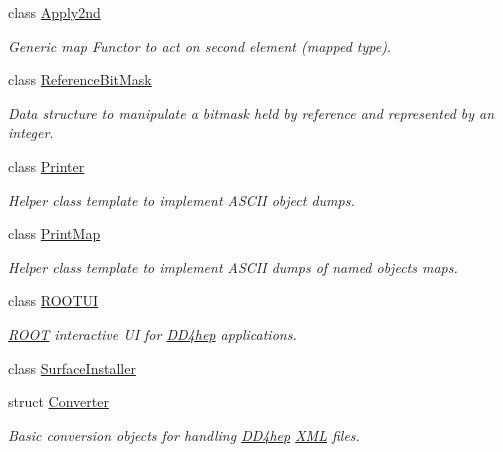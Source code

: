 \begin{DoxyCompactItemize}
class \hyperlink{class_d_d4hep_1_1_apply2nd}{Apply2nd}
\begin{DoxyCompactList}\small\item\em Generic map Functor to act on second element (mapped type). \item\end{DoxyCompactList}\item 
class \hyperlink{class_d_d4hep_1_1_reference_bit_mask}{ReferenceBitMask}
\begin{DoxyCompactList}\small\item\em Data structure to manipulate a bitmask held by reference and represented by an integer. \item\end{DoxyCompactList}\item 
class \hyperlink{struct_d_d4hep_1_1_printer}{Printer}
\begin{DoxyCompactList}\small\item\em Helper class template to implement ASCII object dumps. \item\end{DoxyCompactList}\item 
class \hyperlink{struct_d_d4hep_1_1_print_map}{PrintMap}
\begin{DoxyCompactList}\small\item\em Helper class template to implement ASCII dumps of named objects maps. \item\end{DoxyCompactList}\item 
class \hyperlink{class_d_d4hep_1_1_r_o_o_t_u_i}{ROOTUI}
\begin{DoxyCompactList}\small\item\em \hyperlink{namespace_r_o_o_t}{ROOT} interactive UI for \hyperlink{namespace_d_d4hep}{DD4hep} applications. \item\end{DoxyCompactList}\item 
class \hyperlink{class_d_d4hep_1_1_surface_installer}{SurfaceInstaller}
\item 
struct \hyperlink{struct_d_d4hep_1_1_converter}{Converter}
\begin{DoxyCompactList}\small\item\em Basic conversion objects for handling \hyperlink{namespace_d_d4hep}{DD4hep} \hyperlink{namespace_d_d4hep_1_1_x_m_l}{XML} files. \item\end{DoxyCompactList}\item 

\end{DoxyCompactItemize}
